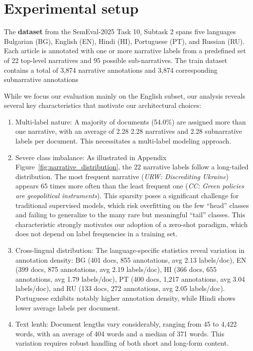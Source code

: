 \section{Experimental setup}


The \textbf{dataset} from the SemEval-2025 Task 10, Subtask 2 \cite{semeval2025task10} spans five languages Bulgarian (BG), English (EN), Hindi (HI), Portuguese (PT), and Russian (RU). Each article is annotated with one or more narrative labels from a predefined set of 22 top-level narratives and 95 possible sub-narratives. The train dataset contains a total of 3,874 narrative annotations and 3,874 corresponding subnarrative annotations

While we focus our evaluation mainly on the English subset, our analysis reveals several key characteristics that motivate our architectural choices:
\begin{enumerate}
\item Multi-label nature: A majority of documents (54.0\%) are assigned more than one narrative, with an average of 2.28 2.28 narratives and 2.28 subnarrative labels per document. This necessitates a multi-label modeling approach.
\item Severe class imbalance: As illustrated in Appendix Figure~\ref{fig:narrative_distribution}, the 22 narrative labels follow a long-tailed distribution. The most frequent narrative (\textit{URW: Discrediting Ukraine}) appears 65 times more often than the least frequent one (\textit{CC: Green policies are geopolitical instruments}). This sparsity poses a significant challenge for traditional supervised models, which risk overfitting on the few ``head'' classes and failing to generalize to the many rare but meaningful ``tail'' classes. This characteristic strongly motivates our adoption of a zero-shot paradigm, which does not depend on label frequencies in a training set.
\item Cross-lingual distribution: The language-specific statistics reveal variation in annotation density: BG (401 docs, 855 annotations, avg 2.13 labels/doc), EN (399 docs, 875 annotations, avg 2.19 labels/doc), HI (366 docs, 655 annotations, avg 1.79 labels/doc), PT (400 docs, 1,217 annotations, avg 3.04 labels/doc), and RU (133 docs, 272 annotations, avg 2.05 labels/doc). Portuguese exhibits notably higher annotation density, while Hindi shows lower average labels per document.
\item Text lenth: Document lengths vary considerably, ranging from 45 to 4,422 words, with an average of 404 words and a median of 371 words. This variation requires robust handling of both short and long-form content.
\end{enumerate}

